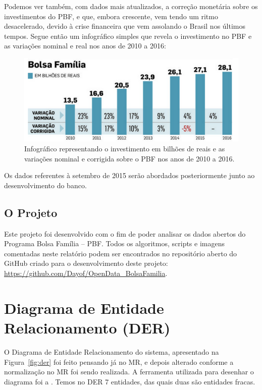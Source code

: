 \documentclass[12pt]{article}
\begin{document}
	Podemos ver também, com dados mais atualizados, a correção monetária sobre os investimentos do PBF, e que, embora crescente, vem tendo um ritmo desacelerado, devido à crise financeira que vem assolando o Brasil nos últimos tempos. Segue então um infográfico simples que revela o investimento no PBF e as variações nominal e real nos anos de 2010 a 2016:
	
	\begin{figure}[H]
		\centering
		\includegraphics[width=1\textwidth]{inf_10_16.png}
		\caption{Infográfico representando o investimento em bilhões de reais e as variações nominal e corrigida sobre o PBF nos anos de 2010 a 2016.}
		\label{fig:inf_10_16}
	\end{figure}
	
	Os dados referentes à setembro de 2015 serão abordados posteriormente junto ao desenvolvimento do banco.
	
	\subsection{O Projeto}
	\label{sec:proj}
	
	Este projeto foi desenvolvido com o fim de poder analisar os dados abertos do Programa Bolsa Família – PBF. Todos os algoritmos, scripts e imagens comentadas neste relatório podem ser encontrados no repositório aberto do GitHub criado para o desenvolvimento deste projeto: \url{https://github.com/Dayof/OpenData_BolsaFamilia}. 
	
	\section{Diagrama de Entidade Relacionamento (DER)}
	\label{sec:der}
	
	O Diagrama de Entidade Relacionamento do sistema, apresentado na Figura~\ref{fig:der} foi feito pensando já no MR, e depois alterado conforme a normalização no MR foi sendo realizada. A ferramenta utilizada para desenhar o diagrama foi a \cite{lucid}. Temos no DER 7 entidades, das quais duas são entidades fracas. 
	
\end{document}
